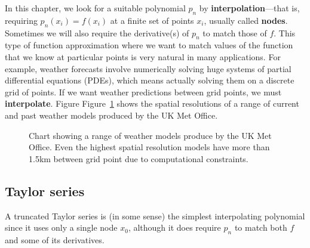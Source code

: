 \documentclass[
  letterpaper,
  DIV=11,
  numbers=noendperiod]{scrreprt}
\begin{document}
In this chapter, we look for a suitable polynomial \(p_n\) by
\textbf{interpolation}---that is, requiring \(p_n(x_i) = f(x_i)\) at a
finite set of points \(x_i\), usually called \textbf{nodes}. Sometimes
we will also require the derivative(s) of \(p_n\) to match those of
\(f\). This type of function approximation where we want to match values
of the function that we know at particular points is very natural in
many applications. For example, weather forecasts involve numerically
solving huge systems of partial differential equations (PDEs), which
means actually solving them on a discrete grid of points. If we want
weather predictions between grid points, we must \textbf{interpolate}.
Figure Figure~\ref{fig-MET} shows the spatial resolutions of a range of
current and past weather models produced by the UK Met Office.

\begin{figure}


\caption{\label{fig-MET}Chart showing a range of weather models produce
by the UK Met Office. Even the highest spatial resolution models have
more than 1.5km between grid point due to computational constraints.}

\end{figure}%

\subsection{Taylor series}\label{taylor-series}

A truncated Taylor series is (in some sense) the simplest interpolating
polynomial since it uses only a single node \(x_0\), although it does
require \(p_n\) to match both \(f\) and some of its derivatives.
\end{document}
